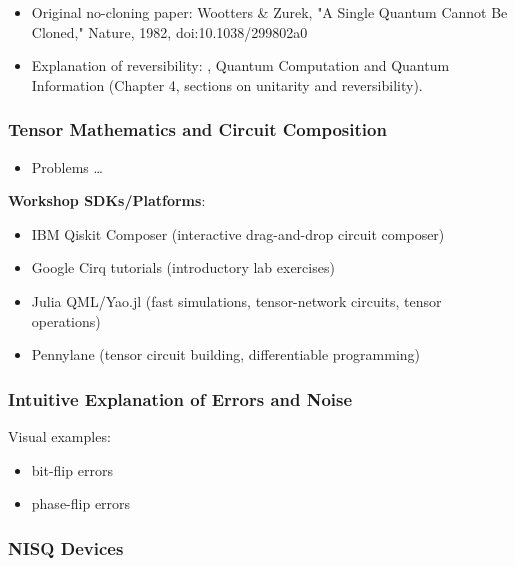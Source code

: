 \begin{itemize}
	\item Original no-cloning paper: Wootters \& Zurek, "A Single Quantum Cannot Be Cloned," Nature, 1982, doi:10.1038/299802a0
	\item Explanation of reversibility: \citeauthor{Nielsen:2000}, Quantum Computation and Quantum Information (Chapter 4, sections on unitarity and reversibility).
\end{itemize}


\subsubsection{Tensor Mathematics and Circuit Composition}

\begin{itemize}
	\item Problems \ldots
\end{itemize}

\textbf{Workshop SDKs/Platforms}:

\begin{itemize}
	\item IBM Qiskit Composer (interactive drag-and-drop circuit composer)
	\item Google Cirq tutorials (introductory lab exercises)
	\item Julia QML/Yao.jl (fast simulations, tensor-network circuits, tensor operations)
	\item Pennylane (tensor circuit building, differentiable programming)
\end{itemize}


\subsubsection{Intuitive Explanation of Errors and Noise}

Visual examples:

\begin{itemize}
	\item bit-flip errors
	\item phase-flip errors
\end{itemize}


\subsubsection{NISQ Devices}

